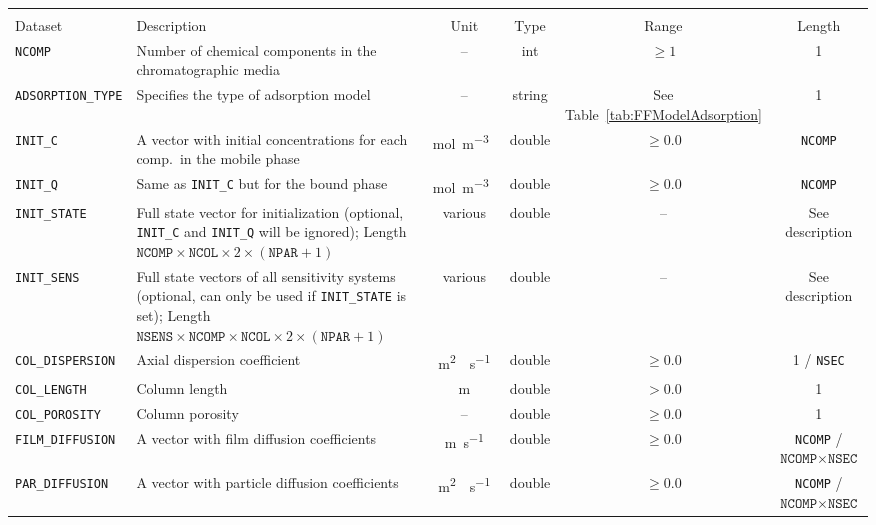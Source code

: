 \begin{table}[!ht]
\footnotesize
\begin{tabu}to \linewidth[m]{lX[m]cccc} \toprule
{} \\
\rowfont[c]\normalfont Dataset & Description & Unit & Type & Range & Length \everyrow{\midrule}\\
\texttt{NCOMP}& Number of chemical components in the chromatographic media & -- & int  & $\geq 1$ & 1 \\
\texttt{ADSORPTION\_TYPE} & Specifies the type of adsorption model & -- & string & See Table~\ref{tab:FFModelAdsorption} & 1 \\
\texttt{INIT\_C} & A vector with initial concentrations for each comp.\ in the mobile phase & \si{\mol\per\cubic\metre{}} & double & $\geq 0.0$ & \texttt{NCOMP}\\
\texttt{INIT\_Q} & Same as \texttt{INIT\_C} but for the bound phase & \si{\mol\per\cubic\metre{}} & double & $\geq 0.0$ & \texttt{NCOMP}\\
\texttt{INIT\_STATE} & Full state vector for initialization (optional, \texttt{INIT\_C} and \texttt{INIT\_Q} will be ignored); Length $\texttt{NCOMP} \times \texttt{NCOL} \times 2 \times \left( \texttt{NPAR} + 1 \right)$ & various & double & -- & See description \\
\texttt{INIT\_SENS} & Full state vectors of all sensitivity systems (optional, can only be used if \texttt{INIT\_STATE} is set); Length $\texttt{NSENS} \times \texttt{NCOMP} \times \texttt{NCOL} \times 2 \times \left( \texttt{NPAR} + 1 \right)$ & various & double & -- & See description \\
\texttt{COL\_DISPERSION} & Axial dispersion coefficient & \si{\square\metre{}\per\second} & double & $\geq 0.0$ & 1 / \texttt{NSEC}\\
\texttt{COL\_LENGTH} & Column length & \si{\metre} & double & $> 0.0$ & 1\\
\texttt{COL\_POROSITY} & Column porosity & -- & double & $\geq 0.0$ & 1\\
\texttt{FILM\_DIFFUSION} & A vector with film diffusion coefficients & \si{\metre\per\second} & double & $\geq 0.0$ & \texttt{NCOMP} / {$\texttt{NCOMP} \times \texttt{NSEC}$}\\
\texttt{PAR\_DIFFUSION} & A vector with particle diffusion coefficients & \si{\square\metre{}\per\second} & double & $\geq 0.0$ & \texttt{NCOMP} / {$\texttt{NCOMP} \times \texttt{NSEC}$}\\

\end{tabu}
\end{table}
